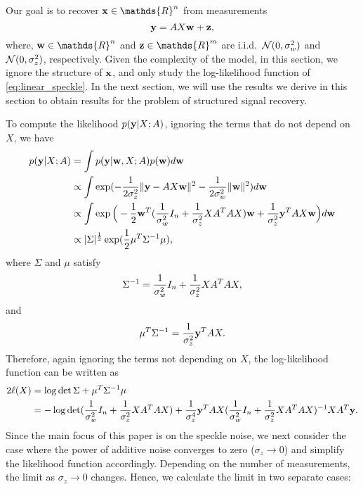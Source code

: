 \documentclass[onecolumn]{IEEEtran}
\newcommand{\wv}{{\bf w}}
\begin{document}
Our goal is to recover $\xv\in\mathds{R}^n$ from  measurements  
\begin{equation}\label{eq:linear_speckle}
\yv=AX\wv+\zv,
\end{equation}
where, $\wv\in\mathds{R}^n$ and $\zv\in\mathds{R}^m$ are i.i.d.~$\mathcal{N}(0,\sigma_w^2)$ and $\mathcal{N}(0,\sigma_z^2)$, respectively. Given the complexity of the model, in this section, we ignore the structure of ${\bf x}$, and only study the log-likelihood function of \eqref{eq:linear_speckle}. In the next section, we will use the results we derive in this section to obtain results for the problem of structured signal recovery. 

 To compute the likelihood $p({\bf y}|X;A)$, ignoring the terms that do not depend on $X$, we have
\begin{align}
p(\yv|X;A)&= \int p(\yv|\wv,X;A)p(\wv)d\wv\nonumber\\
&\propto \int \exp(-{1\over 2\sigma_z^2}\|\yv-AX\wv\|^2-{1\over 2\sigma_w^2}\|\wv\|^2)d\wv\nonumber\\
&\propto \int \exp\Big(-{1\over 2} \wv^T({1\over \sigma_w^2}I_n+ {1\over \sigma_z^2}XA^TAX)\wv+ {1\over \sigma_z^2}\yv^TAX\wv\Big)d\wv\nonumber\\
&\propto |\Sigma|^{1\over 2}\exp({1\over 2}\mu^T\Sigma^{-1}\mu),
\end{align}
where $\Sigma$ and $\mu$ satisfy
\[
\Sigma^{-1}={1\over \sigma_w^2}I_n+ {1\over \sigma_z^2}XA^TAX,
\] 
and 
\[
\mu^T\Sigma^{-1}={1\over \sigma_z^2}{\bf y}^TAX.
\]
Therefore, again ignoring the terms not depending on $X$, the log-likelihood function can be written as
\begin{align}
2\ell(X)
&=\log\det \Sigma +\mu^T\Sigma^{-1}\mu\nonumber\\
&=-\log\det({1\over \sigma_w^2}I_n+ {1\over \sigma_z^2}XA^TAX)+{1\over \sigma_z^4}{\bf y}^TAX({1\over \sigma_w^2}I_n+ {1\over \sigma_z^2}XA^TAX)^{-1}XA^T{\bf y}.\label{eq:def-ell-X}
\end{align}
Since the main focus of this paper is on the speckle noise, we next consider the case where the power of additive noise converges to zero ($\sigma_z\to 0$) and simplify the likelihood function accordingly. Depending on the number of measurements, the limit as $\sigma_z \rightarrow 0$ changes. Hence, we calculate the limit in two separate cases:
\end{document}
